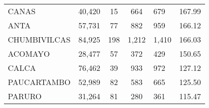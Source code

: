 \begin{tabular}{lrcclr}
	\cellcolor[HTML]{FFFF99}CANAS                                  & 40,420                                                         & 15                                                         & 664                  & 679                                                                 & 167.99                                                                       \\
	\cellcolor[HTML]{FFFF99}ANTA                                   & 57,731                                                         & 77                                                         & 882                  & 959                                                                 & 166.12                                                                       \\
	\cellcolor[HTML]{C6E0B4}CHUMBIVILCAS                           & 84,925                                                         & 198                                                        & 1,212                & 1,410                                                               & 166.03                                                                       \\
	\cellcolor[HTML]{C6E0B4}ACOMAYO                                & 28,477                                                         & 57                                                         & 372                  & 429                                                                 & 150.65                                                                       \\
	\cellcolor[HTML]{C6E0B4}CALCA                                  & 76,462                                                         & 39                                                         & 933                  & 972                                                                 & 127.12                                                                       \\
	\cellcolor[HTML]{C6E0B4}PAUCARTAMBO                            & 52,989                                                         & 82                                                         & 583                  & 665                                                                 & 125.50                                                                       \\
	\cellcolor[HTML]{C6E0B4}PARURO                                 & 31,264                                                         & 81                                                         & 280                  & 361                                                                 & 115.47                                                                       \\

\end{tabular}
